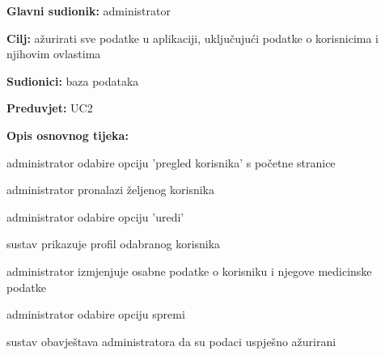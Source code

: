         
                    \noindent {}
					\begin{packed_item}
	
						\item \textbf{Glavni sudionik: }administrator
						\item  \textbf{Cilj:} ažurirati sve podatke u aplikaciji, uključujući podatke o korisnicima i njihovim ovlastima
						\item  \textbf{Sudionici:} baza podataka
						\item  \textbf{Preduvjet:} UC2
						\item  \textbf{Opis osnovnog tijeka:}
						
						\item[] \begin{packed_enum}
							\item administrator odabire opciju 'pregled korisnika' s početne stranice
							\item administrator pronalazi željenog korisnika
							\item administrator odabire opciju 'uredi'
							\item sustav prikazuje profil odabranog korisnika
							\item administrator izmjenjuje osabne podatke o korisniku i njegove medicinske podatke
							\item administrator odabire opciju spremi
							\item sustav obavještava administratora da su podaci uspješno ažurirani
						
						\end{packed_enum}
					
					\end{packed_item}

	
						
	
